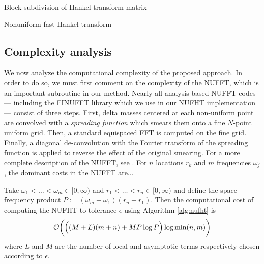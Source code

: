 \begin{algorithm2e}[t]
    \caption{Block subdivision of Hankel transform
    matrix}\label{alg:subdivision}
    
\end{algorithm2e}

\begin{algorithm2e}[t]
    \caption{Nonuniform fast Hankel transform}\label{alg:nufht}
    
\end{algorithm2e}

\subsection{Complexity analysis}

We now analyze the computational complexity of the proposed approach. In order
to do so, we must first comment on the complexity of the NUFFT, which is an
important subroutine in our method. Nearly all analysis-based NUFFT codes ---
including the FINUFFT library \cite{barnett2019parallel} which we use in our
NUFHT implementation --- consist of three steps. First, delta masses centered at
each non-uniform point are convolved with a \textit{spreading function} which
smears them onto a fine $N$-point uniform grid. Then, a standard equispaced FFT
is computed on the fine grid. Finally, a diagonal de-convolution with the
Fourier transform of the spreading function is applied to reverse the effect of
the original smearing. For a more complete description of the NUFFT, see
\todocite. For $n$ locations $r_k$ and $m$ frequencies $\omega_j$, the dominant
costs in the NUFFT are... 

\begin{theorem}
    Take $\omega_1 < \dots < \omega_m \in [0,\infty)$ and $r_1 < \dots < r_n \in
    [0,\infty)$ and define the space-frequency product $P := (\omega_m -
    \omega_1)(r_n - r_1)$. Then the computational cost of computing the NUFHT to
    tolerance $\epsilon$ using Algorithm \ref{alg:nufht} is 
    $$\mathcal{O}\bigg(\Big((M + L)(m + n) + MP\log P\Big) \log \min(n,m) \bigg)$$ where
    $L$ and $M$ are the number of local and asymptotic terms respectively chosen
    according to $\epsilon$.
\end{theorem}

